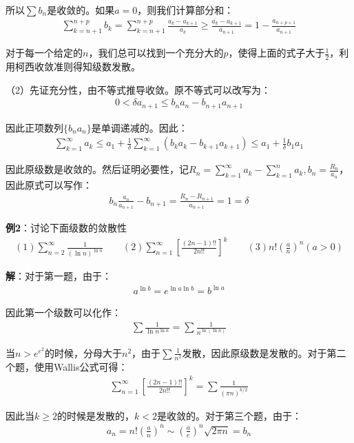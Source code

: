 \documentclass{ctexart}
\let\oldtextbf\textbf
\renewcommand{\textbf}[1]{\textcolor{brown!50!red}{\oldtextbf{#1}}}
\begin{document}
所以$\sum b_n$是收敛的。如果$a=0$，则我们计算部分和：
\begin{align*}
\sum_{k=n+1}^{n+p}b_k=\sum_{k=n+1}^{n+p}\frac{a_k-a_{k+1}}{a_k}\geq \frac{a_k-a_{k+1}}{a_{n+1}}=1-\frac{a_{n+p+1}}{a_{n+1}}
\end{align*}

对于每一个给定的$n$，我们总可以找到一个充分大的$p$，使得上面的式子大于$\frac{1}{2}$，利用柯西收敛准则得知级数发散。

（2）先证充分性，由不等式推导收敛。原不等式可以改写为：
\begin{align*}
    0<\delta a_{n+1}\leq b_na_n-b_{n+1}a_{n+1}
\end{align*}

因此正项数列$\{b_na_n\}$是单调递减的。因此：
\begin{align*}
    \sum_{k=1}^\infty a_k\leq a_1+\frac{1}{\delta}\sum_{k=1}^\infty (b_ka_k-b_{k+1}a_{k+1})\leq a_1+\frac{1}{\delta}b_1a_1
\end{align*}

因此原级数是收敛的。然后证明必要性，记$R_n=\sum_{k=1}^\infty a_k-\sum_{k=1}^n a_k,b_n=\frac{R_n}{a_n}$，因此原式可以写作：
\begin{align*}
    b_n\frac{a_n}{a_{n+1}}-b_{n+1}=\frac{R_n-R_{n+1}}{a_{n+1}}=1=\delta
\end{align*}

\textbf{\color{brown!50!red}例2}：讨论下面级数的敛散性
\begin{align*}
    (1)\sum_{n=2}^\infty \frac{1}{(\ln n)^{\ln n}}\qquad
   (2)\sum_{n=1}^\infty \left[ \frac{(2n-1)!!}{2n!!}\right]^k\qquad
   (3) n!(\frac{a}{n})^n(a>0)
\end{align*}

\textbf{\color{brown!50!red}解}：对于第一题，由于：
\begin{align*}
    a^{\ln b}=e^{\ln a\ln b}=b^{\ln a}
\end{align*}

因此第一个级数可以化作：
\begin{align*}
    \sum\frac{1}{\ln n^{\ln n}}=\sum\frac{1}{n^{\ln(\ln n)}}
\end{align*}

当$n>e^{e^2}$的时候，分母大于$n^2$，由于$\sum \frac{1}{n^2}$发散，因此原级数是发散的。对于第二个题，使用Wallis公式可得：
\begin{align*}
    \sum_{n=1}^\infty \left[ \frac{(2n-1)!!}{2n!!}\right]^k=\sum\frac{1}{(\pi n)^{k/2}}
\end{align*}

因此当$k\geq 2$的时候是发散的，$k<2$是收敛的。对于第三个题，由于：
\begin{align*}
    a_n=n!(\frac{a}{n})^n\sim(\frac{a}{e})^n\sqrt{2\pi n}=b_n
\end{align*}
\end{document}
